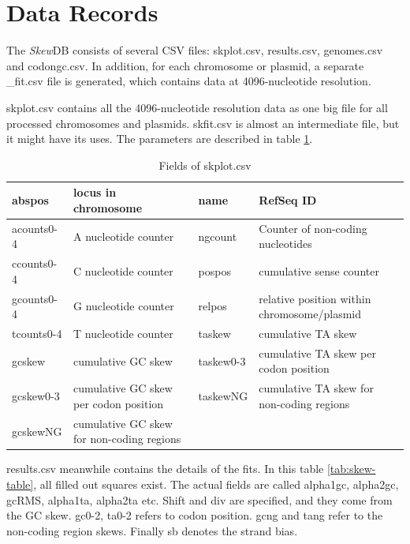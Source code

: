 \documentclass[fleqn,10pt]{wlscirep}
\begin{document}
\section*{Data Records}
The \emph{Skew}DB consists of several CSV files: skplot.csv, results.csv, genomes.csv and codongc.csv.
In addition, for each chromosome or plasmid, a separate \_fit.csv file is generated, which contains data at 4096-nucleotide resolution.

skplot.csv contains all the 4096-nucleotide resolution data as one big file for all processed chromosomes and plasmids. skfit.csv is almost an intermediate file, but it might have its uses. The parameters are described in table \ref{tab:skplot}.
\begin{table}[ht]
\begin{tabular}{|l|l|l|l|}
\hline
abspos     & locus in chromosome                       & name      & RefSeq ID                                   \\ \hline
acounts0-4 & A nucleotide counter                      & ngcount   & Counter of non-coding nucleotides           \\ \hline
ccounts0-4 & C nucleotide counter                      & pospos    & cumulative sense counter                    \\ \hline
gcounts0-4 & G nucleotide counter                      & relpos    & relative position within chromosome/plasmid \\ \hline
tcounts0-4 & T nucleotide counter                      & taskew    & cumulative TA skew                          \\ \hline
gcskew     & cumulative GC skew                        & taskew0-3 & cumulative TA skew per codon position       \\ \hline
gcskew0-3  & cumulative GC skew per codon position     & taskewNG  & cumulative TA skew for non-coding regions   \\ \hline
gcskewNG   & cumulative GC skew for non-coding regions &           &                                             \\ \hline
\end{tabular}
\caption{Fields of skplot.csv}
\label{tab:skplot}
\end{table}

results.csv meanwhile contains the details of the fits. In this table \ref{tab:skew-table}, all filled out squares exist. The actual fields
are called alpha1gc, alpha2gc, gcRMS, alpha1ta, alpha2ta etc. Shift and div are specified, and they come from the GC skew.
gc0-2, ta0-2 refers to codon position. gcng and tang refer to the non-coding region skews. Finally sb denotes the strand bias. 
\end{document}
